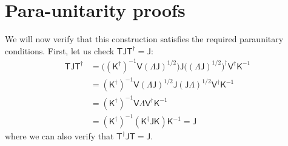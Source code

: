 \documentclass[aps, prx, nofootinbib, superscriptaddress]{revtex4-2}
\begin{document}
\section{Para-unitarity proofs}\label{app:paraunitary}
We will now verify that this construction satisfies the required paraunitary conditions. First, let us check $\mathsf{TJT}^{\dagger} = \mathsf{J}$:
\begin{align*}
    \mathsf{TJT}^{\dagger} &= 
    \big( (\mathsf{K}^{\dagger})^{-1} \mathsf{V} \mathsf{(\Lambda J)}^{1/2} \big) \mathsf{J} \big( \mathsf{(\Lambda J)}^{1/2} \big)^{\dagger} \mathsf{V}^{\dagger} \mathsf{K}^{-1} \\
    &= (\mathsf{K}^{\dagger})^{-1} \mathsf{V} \mathsf{(\Lambda J)}^{1/2} \mathsf{J} \mathsf{(J\Lambda)}^{1/2} \mathsf{V}^{\dagger} \mathsf{K}^{-1} \\
    &= (\mathsf{K}^{\dagger})^{-1} \mathsf{V} \mathsf{\Lambda} \mathsf{V}^{\dagger} \mathsf{K}^{-1} \\
    &= (\mathsf{K}^{\dagger})^{-1} (\mathsf{K}^{\dagger} \mathsf{JK}) \mathsf{K}^{-1} = \mathsf{J}
\end{align*}
where we can also verify that $\mathsf{T}^{\dagger} \mathsf{JT} = \mathsf{J}$.
\end{document}
